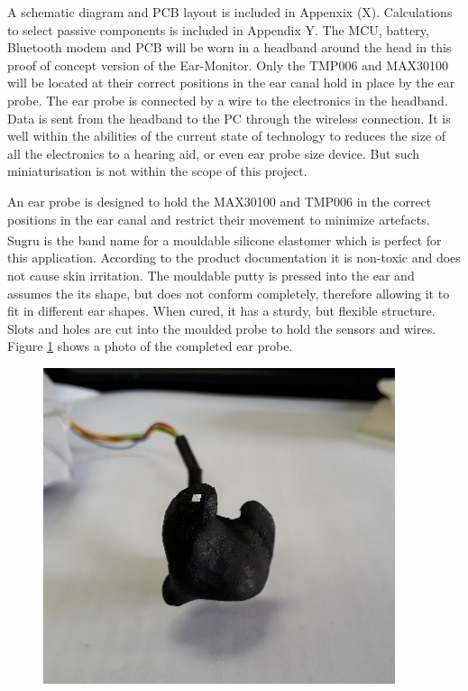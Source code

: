 A schematic diagram and PCB layout is included in Appenxix (X). Calculations to select passive components is included in Appendix Y. The MCU, battery, Bluetooth modem and PCB will be worn in a headband around the head in this proof of concept version of the Ear-Monitor. Only the TMP006 and MAX30100 will be located at their correct positions in the ear canal hold in place by the ear probe. The ear probe is connected by a wire to the electronics in the headband. Data is sent from the headband to the PC through the wireless connection. It is well within the abilities of the current state of technology to reduces the size of all the electronics to a hearing aid, or even ear probe size device. But such miniaturisation is not within the scope of this project.

\medskip

An ear probe is designed to hold the MAX30100 and TMP006 in the correct positions in the ear canal and restrict their movement to minimize artefacts. Sugru\textsuperscript{\textregistered} is the band name for a mouldable silicone elastomer which is perfect for this application. According to the product documentation it is non-toxic and does not cause skin irritation. The mouldable putty is pressed into the ear and assumes the its shape, but does not conform completely, therefore allowing it to fit in different ear shapes. When cured, it has a sturdy, but flexible structure. Slots and holes are cut into the moulded probe to hold the sensors and wires. Figure \ref{fig:EarProbe} shows a photo of the completed ear probe.

\begin{figure}[H]
   \centering
   \includegraphics[scale=1]{figs/EarProbe.jpg}
   \caption{}
   \label{fig:EarProbe}
\end{figure}